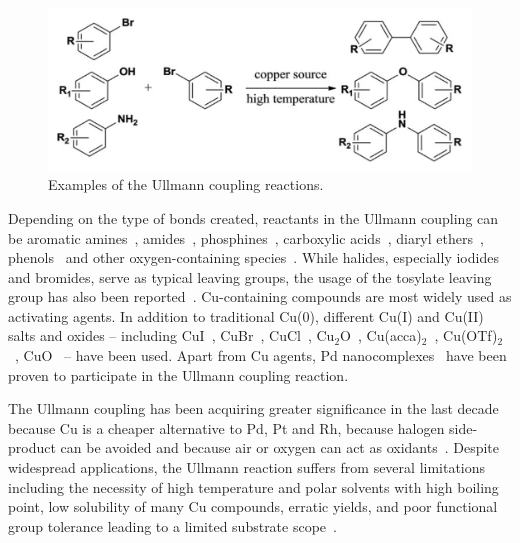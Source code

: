 \documentclass[%
 reprint,
 amsmath,amssymb,
 aps,
prb,
]{revtex4-2}
\begin{document}
\begin{figure}[htb]
\centering
\includegraphics[width=0.90\columnwidth]{Fig/classical.png}
\caption{Examples of the Ullmann coupling reactions.}
\label{fig:UllmannCoupling}
\end{figure}

Depending on the type of bonds created, reactants in the Ullmann coupling can be aromatic amines~\cite{ullmann_17,ullmann_18}, amides~\cite{ullmann_19,ullmann_20}, phosphines~\cite{ullmann_21,ullmann_22}, carboxylic acids~\cite{ullmann_23}, diaryl ethers~\cite{ullmann_24}, phenols~\cite{ullmann_25} and other oxygen-containing species~\cite{ullmann_26,ullmann_27,ullmann_28}. 
While halides, especially iodides and bromides, serve as typical leaving groups, the usage of the tosylate leaving group has also been reported~\cite{ullmann_15}. 
Cu-containing compounds are most widely used as activating agents. In addition to traditional Cu(0), different Cu(I) and Cu(II) salts and oxides -- including CuI~\cite{ullmann_07,ullmann_08,ullmann_09}, CuBr~\cite{ullmann_10,ullmann_11}, CuCl~\cite{ullmann_13}, Cu$_2$O~\cite{ullmann_12}, Cu(acca)$_2$~\cite{ullmann_14}, Cu(OTf)$_2$~\cite{ullmann_15}, CuO~\cite{ullmann_16} -- have been used. 
Apart from Cu agents, Pd nanocomplexes~\cite{ullmann_35, ullmann_36}  have been proven to participate in the Ullmann coupling reaction. 

The Ullmann coupling has been acquiring greater significance in the last decade because Cu is a cheaper alternative to Pd, Pt and Rh, because halogen side-product can be avoided and because air or oxygen can act as oxidants~\cite{ullmann_38,ullmann_39,ullmann_40,ullmann_41}. Despite widespread applications, the Ullmann reaction suffers from several limitations including the necessity of high temperature and polar solvents with high boiling point, low solubility of many Cu compounds, erratic yields, and poor functional group tolerance leading to a limited substrate scope~\cite{ullmann_31}. %
\end{document}
